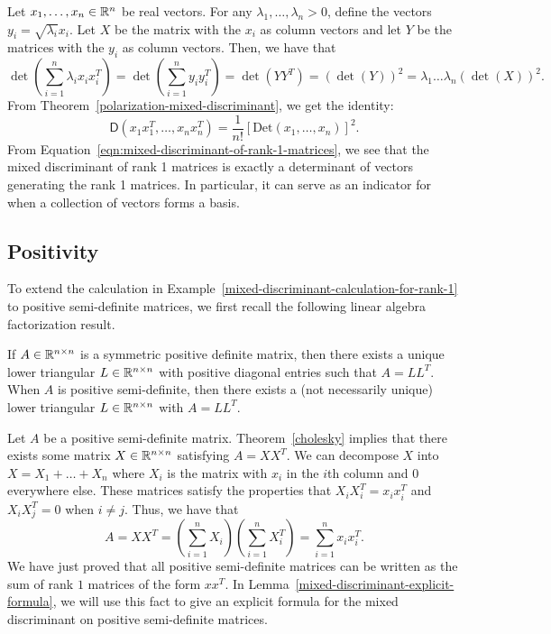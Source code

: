 \documentclass{puthesis-UG}
\begin{document}
\begin{example} \label{mixed-discriminant-calculation-for-rank-1}
	Let $x_1, \ldots, x_n \in \mathbb{R}^n$ be real vectors. For any $\lambda_1, \ldots, \lambda_n > 0$, define the vectors $y_i = \sqrt{\lambda_i} x_i$. Let $X$ be the matrix with the $x_i$ as column vectors and let $Y$ be the matrices with the $y_i$ as column vectors. Then, we have that 
	\[
		\det \left ( \sum_{i = 1}^n \lambda_i x_i x_i^T \right ) = \det \left ( \sum_{i = 1}^n y_i y_i^T \right ) = \det (YY^T) = (\det (Y))^2 = \lambda_1 \ldots \lambda_n (\det (X))^2.
	\]
	From Theorem~\ref{polarization-mixed-discriminant}, we get the identity:
	\begin{equation} \label{eqn:mixed-discriminant-of-rank-1-matrices}
		\mathsf{D} (x_1x_1^T, \ldots, x_nx_n^T) = \frac{1}{n!} \left [ \text{Det} (x_1, \ldots, x_n) \right ]^2.
	\end{equation}
	From Equation~\ref{eqn:mixed-discriminant-of-rank-1-matrices}, we see that the mixed discriminant of rank 1 matrices is exactly a determinant of vectors generating the rank 1 matrices. In particular, it can serve as an indicator for when a collection of vectors forms a basis. 
\end{example}



\subsection{Positivity}

To extend the calculation in Example~\ref{mixed-discriminant-calculation-for-rank-1} to positive semi-definite matrices, we first recall the following linear algebra factorization result. 

\begin{thm}  \label{cholesky}
	If $A \in \mathbb{R}^{n \times n}$ is a symmetric positive definite matrix, then there exists a unique lower triangular $L \in \mathbb{R}^{n \times n}$ with positive diagonal entries such that $A = LL^T$. When $A$ is positive semi-definite, then there exists a (not necessarily unique) lower triangular $L \in \mathbb{R}^{n \times n}$ with $A = LL^T$. 
\end{thm}

Let $A$ be a positive semi-definite matrix. Theorem~\ref{cholesky} implies that there exists some matrix $X \in \mathbb{R}^{n \times n}$ satisfying $A = X X^T$. We can decompose $X$ into $X = X_1 + \ldots + X_n$ where $X_i$ is the matrix with $x_i$ in the $i$th column and $0$ everywhere else. These matrices satisfy the properties that $X_i X_i^T = x_ix_i^T$ and $X_i X_j^T = 0$ when $i \neq j$. Thus, we have that 
\[
	A = X X^T = \left ( \sum_{i = 1}^n X_i \right ) \left ( \sum_{i = 1}^n X_i^T \right ) = \sum_{i = 1}^n x_ix_i^T.
\]
We have just proved that all positive semi-definite matrices can be written as the sum of rank $1$ matrices of the form $xx^T$. In Lemma~\ref{mixed-discriminant-explicit-formula}, we will use this fact to give an explicit formula for the mixed discriminant on positive semi-definite matrices. 
\end{document}
